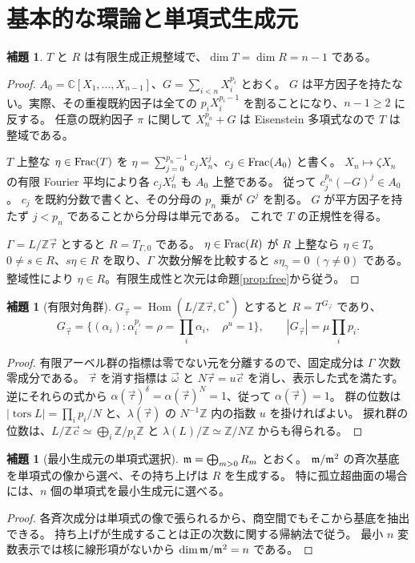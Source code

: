 \documentclass[11pt,a4paper]{ltjsarticle}
\numberwithin{equation}{section}
\theoremstyle{definition}
\newtheorem{lemma}[theorem]{補題}
\newcommand{\Z}{\mathbb Z}\newcommand{\N}{\mathbb N}\newcommand{\Q}{\mathbb Q}\newcommand{\C}{\mathbb C}
\newcommand{\cc}{\vec c}\newcommand{\xx}{\vec x}\newcommand{\om}{\vec\omega}\newcommand{\ta}{\vec\tau}
\begin{document}
\section{基本的な環論と単項式生成元}\label{sec:algebra}
\begin{lemma}\label{lem:normal}
$T$ と $R$ は有限生成正規整域で、$\dim T=\dim R=n-1$ である。
\end{lemma}
\begin{proof}
$A_0=\C[X_1,\dots,X_{n-1}]$、$G=\sum_{i<n}X_i^{p_i}$ とおく。
$G$ は平方因子を持たない。実際、その重複既約因子は全ての $p_iX_i^{p_i-1}$ を割ることになり、$n-1\ge2$ に反する。
任意の既約因子 $\pi$ に関して $X_n^{p_n}+G$ は Eisenstein 多項式なので $T$ は整域である。

$T$ 上整な $\eta\in\operatorname{Frac}(T)$ を
$\eta=\sum_{j=0}^{p_n-1}c_jX_n^j$、$c_j\in\operatorname{Frac}(A_0)$ と書く。
$X_n\mapsto\zeta X_n$ の有限 Fourier 平均により各 $c_jX_n^j$ も $A_0$ 上整である。
従って $c_j^{p_n}(-G)^j\in A_0$。
$c_j$ を既約分数で書くと、その分母の $p_n$ 乗が $G^j$ を割る。
$G$ が平方因子を持たず $j<p_n$ であることから分母は単元である。
これで $T$ の正規性を得る。

$\Gamma=L/\Z\ta$ とすると $R=T_{\Gamma,0}$ である。
$\eta\in\operatorname{Frac}(R)$ が $R$ 上整なら $\eta\in T$。
$0\ne s\in R$、$s\eta\in R$ を取り、$\Gamma$ 次数分解を比較すると $s\eta_\gamma=0$ $(\gamma\ne0)$ である。
整域性により $\eta\in R$。有限生成性と次元は命題\ref{prop:free}から従う。
\end{proof}

\begin{lemma}[有限対角群]\label{lem:group}
$G_{\ta}=\operatorname{Hom}(L/\Z\ta,\C^*)$ とすると $R=T^{G_{\ta}}$ であり、
\begin{equation}\label{eq:group}
 G_{\ta}=\{(\alpha_i):\alpha_i^{p_i}=\rho=\prod_i\alpha_i,\quad\rho^u=1\},
 \qquad |G_{\ta}|=\mu\prod_i p_i.
\end{equation}
\end{lemma}
\begin{proof}
有限アーベル群の指標は零でない元を分離するので、固定成分は $\Gamma$ 次数零成分である。
$\ta$ を消す指標は $\om$ と $N\ta=u\cc$ を消し、表示した式を満たす。
逆にそれらの式から $\alpha(\ta)^\delta=\alpha(\ta)^N=1$、従って $\alpha(\ta)=1$。
群の位数は $|\operatorname{tors}L|=\prod_i p_i/N$ と、$\lambda(\ta)$ の $N^{-1}\Z$ 内の指数 $u$ を掛ければよい。
捩れ群の位数は、$L/\Z\cc\simeq\bigoplus_i\Z/p_i\Z$ と $\lambda(L)/\Z\simeq\Z/N\Z$ からも得られる。
\end{proof}

\begin{lemma}[最小生成元の単項式選択]\label{lem:generators}
$\mathfrak m=\bigoplus_{m>0}R_m$ とおく。
$\mathfrak m/\mathfrak m^2$ の斉次基底を単項式の像から選べ、その持ち上げは $R$ を生成する。
特に孤立超曲面の場合には、$n$ 個の単項式を最小生成元に選べる。
\end{lemma}
\begin{proof}
各斉次成分は単項式の像で張られるから、商空間でもそこから基底を抽出できる。
持ち上げが生成することは正の次数に関する帰納法で従う。
最小 $n$ 変数表示では核に線形項がないから $\dim\mathfrak m/\mathfrak m^2=n$ である。
\end{proof}
\end{document}
